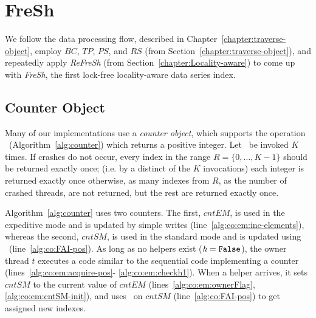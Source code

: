 \chapter{FreSh}
\label{chapter:FreSh}

We follow the data processing flow, described in Chapter~\ref{chapter:traverse-object},
employ $\mathit{BC}$, $\mathit{TP}$, $\mathit{PS}$, and $\mathit{RS}$ (from Section~\ref{chapter:traverse-object}),
and repeatedly apply \textit{ReFreSh} (from Section~\ref{chapter:Locality-aware}) to come up with \textit{FreSh},
the first lock-free locality-aware data series index.

\section{Counter Object}



Many of our implementations use a {\em counter object}, which supports the
operation \NextIndex\ (Algorithm~\ref{alg:counter}) which returns a positive integer. 
Let \NextIndex\ be invoked $K$ times.
If crashes do not occur, every index in the range $R = 
\{0, \ldots, K-1\}$ should be returned exactly once; 
(i.e. by a distinct of the $K$ invocations) each integer 
is returned exactly once otherwise, as many indexes from $R$,
as the number of crashed  threads, 
are not returned, but the rest are returned exactly once.

Algorithm~\ref{alg:counter} uses two counters. The first, $\mathit{cntEM}$,
is used in the expeditive mode and is updated by simple writes
(line~\ref{alg:co:em:inc-elements}),
whereas the second, $\mathit{cntSM}$, is used in the standard mode and
is updated using \FAI\ (line~\ref{alg:co:FAI-pos}).
As long as no helpers exist ($\mathit{h = \mbox{\texttt{False}}}$), the owner thread $t$ executes 
a code similar to the sequential code implementing a counter (lines~\ref{alg:co:em:acquire-pos}-
\ref{alg:co:em:checkh1}). When a helper arrives, it sets $\mathit{cntSM}$ to the current
value of $cntEM$ (lines~\ref{alg:co:em:ownerFlag}, \ref{alg:co:em:cntSM-init}),
and uses \FAI\ on $\mathit{cntSM}$ (line~\ref{alg:co:FAI-pos}) to get assigned new indexes. 

